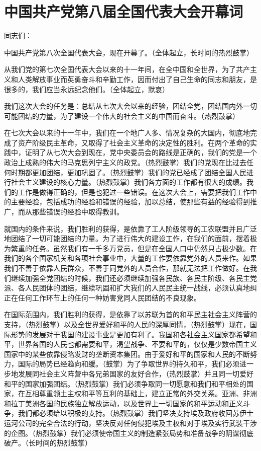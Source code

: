 \section[中国共产党第八届全国代表大会开幕词（一九五六年九月十五日）]{中国共产党第八届全国代表大会开幕词}


同志们：

中国共产党第八次全国代表大会，现在开幕了。（全体起立，长时间的热烈鼓掌）

从我们党的第七次全国代表大会以来的十一年间，在全中国和全世界，为了共产主义和人类解放事业而英勇奋斗和辛勤工作，因而付出了自己生命的同志和朋友，是很多的，我们应当永远纪念他们。（全体起立，默哀）

我们这次大会的任务是：总结从七次大会以来的经验，团结全党，团结国内外一切可能团结的力量，为了建设一个伟大的社会主义的中国而奋斗。（热烈鼓掌）

在七次大会以来的十一年中，我们在一个地广人多、情况复杂的大国内，彻底地完成了资产阶级民主革命，又取得了社会主义革命的决定性的胜利。在两个革命的实践中，证明了从七次大会到现在，党中央委员会的路线是正确的，我们的党是一个政治上成熟的伟大的马克思列宁主义的政党。（热烈鼓掌）我们的党现在比过去任何时期都更加团结，更加巩固了。（热烈鼓掌）我们的党已经成了团结全国人民进行社会主义建设的核心力量。（热烈鼓掌）我们各方面的工作都有很大的成绩。我们的工作是做得正确的，但是也犯过一些错误。在这次大会上，需要把我们工作中的主要经验，包括成功的经验和错误的经验，加以总结，使那些有益的经验得到推广，而从那些错误的经验中取得教训。

就国内的条件来说，我们胜利的获得，是依靠了工人阶级领导的工农联盟并且广泛地团结了一切可能团结的力量。为了进行伟大的建设工作，在我们的面前，摆着极为繁重的任务。虽然我们有一千多万党员，但是在全国人口中仍然只占极少数。在我们的各个国家机关和各项社会事业中，大量的工作要依靠党外的人员来作。如果我们不善于依靠人民群众，不善于同党外的人员合作，那就无法把工作做好。在我们继续加强全党团结的时候，我们还必须继续加强各民族、各民主阶级、各民主党派、各人民团体的团结，继续巩固和扩大我们的人民民主统一战线，必须认真地纠正在任何工作环节上的任何一种妨害党同人民团结的不良现象。

在国际范围内，我们胜利的获得，是依靠了以苏联为首的和平民主社会主义阵营的支持，（热烈鼓掌）以及全世界爱好和平的人民的深厚同情，（热烈鼓掌）现在，国际形势的发展对于我国的建设事业是更加有利了。我国和各社会主义国家都希望和平，世界各国的人民也都需要和平，渴望战争、不要和平的，仅仅是少数帝国主义国家中的某些依靠侵略发财的垄断资本集团。由于爱好和平的国家和人民的不断努力，国际的局势已经趋向和缓。（鼓掌）为了争取世界的持久和平，我们必须进一步地发展同社会主义阵营中各兄弟国家的友好合作，（热烈鼓掌）并且同一切爱好和平的国家加强团结。（热烈鼓掌）我们必须争取同一切愿意和我们和平相处的国家，在互相尊重领土主权和平等互利的基础上，建立正常的外交关系。亚洲、非洲和拉丁美洲各国的民族独立解放运动，以及世界上一切国家的和平运动和正义斗争，我们都必须给以积极的支持。（热烈鼓掌）我们坚决支持埃及政府收回苏伊士运河公司的完全合法的行动，坚决反对任何侵犯埃及主权和对于埃及实行武装干涉的企图。（热烈鼓掌）我们必须使帝国主义的制造紧张局势和准备战争的阴谋彻底破产。（长时间的热烈鼓掌）

